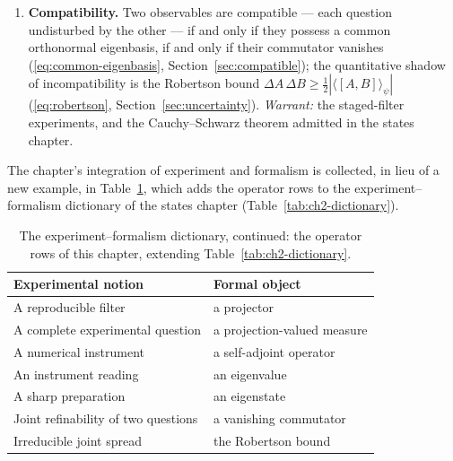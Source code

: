 \begin{enumerate}
    \item[\textbf{(M5)}] \textbf{Compatibility.} Two observables are compatible --- each question undisturbed by the other --- if and only if they possess a common orthonormal eigenbasis, if and only if their commutator vanishes (\eqref{eq:common-eigenbasis}, Section~\ref{sec:compatible}); the quantitative shadow of incompatibility is the Robertson bound $\Delta A\,\Delta B \geq \tfrac{1}{2}|\langle[A,B]\rangle_\psi|$ (\eqref{eq:robertson}, Section~\ref{sec:uncertainty}). \emph{Warrant:} the staged-filter experiments, and the Cauchy--Schwarz theorem admitted in the states chapter.
\end{enumerate}

The chapter's integration of experiment and formalism is collected, in lieu of a new example, in Table~\ref{tab:ch3-dictionary}, which adds the operator rows to the experiment--formalism dictionary of the states chapter (Table~\ref{tab:ch2-dictionary}).
\begin{table}[htbp!]
    \centering
    \caption{The experiment--formalism dictionary, continued: the operator rows of this chapter, extending Table~\ref{tab:ch2-dictionary}.}
    \label{tab:ch3-dictionary}
    \begin{tabular}{ll}
        \toprule
        Experimental notion & Formal object \\
        \midrule
        A reproducible filter & a projector \\
        A complete experimental question & a projection-valued measure \\
        A numerical instrument & a self-adjoint operator \\
        An instrument reading & an eigenvalue \\
        A sharp preparation & an eigenstate \\
        Joint refinability of two questions & a vanishing commutator \\
        Irreducible joint spread & the Robertson bound \\
        \bottomrule
    \end{tabular}
\end{table}

